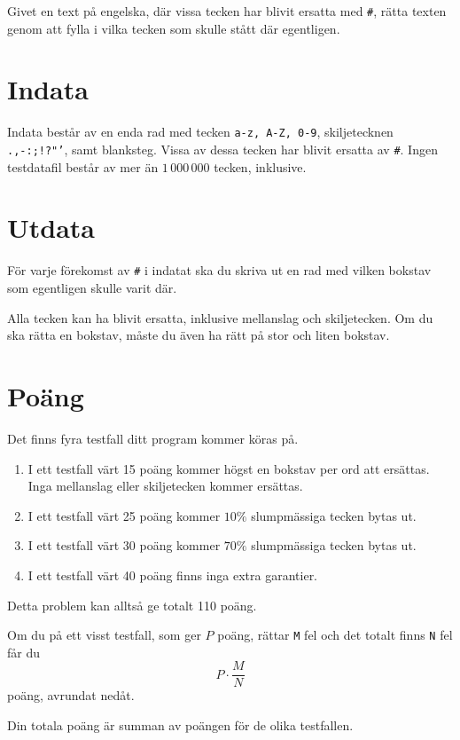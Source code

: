 
Givet en text på engelska, där vissa tecken har blivit ersatta med \texttt{\#}, rätta texten genom att fylla i vilka tecken som skulle stått där egentligen.

\section*{Indata}
Indata består av en enda rad med tecken \texttt{a-z, A-Z, 0-9}, skiljetecknen \texttt{.,-:;!?"'}, samt blanksteg. Vissa av dessa tecken har blivit ersatta av \texttt{\#}.
Ingen testdatafil består av mer än $1\,000\,000$ tecken, inklusive.

\section*{Utdata}
För varje förekomst av \texttt{\#} i indatat ska du skriva ut en rad med vilken bokstav som egentligen skulle varit där.

Alla tecken kan ha blivit ersatta, inklusive mellanslag och skiljetecken. Om du ska rätta en bokstav, måste du även ha rätt på stor och liten bokstav.

\section*{Poäng}

Det finns fyra testfall ditt program kommer köras på.
\begin{enumerate}
  \item I ett testfall värt 15 poäng kommer högst en bokstav per ord att ersättas. Inga mellanslag eller skiljetecken kommer ersättas.
  \item I ett testfall värt 25 poäng kommer $10\%$ slumpmässiga tecken bytas ut.
  \item I ett testfall värt 30 poäng kommer $70\%$ slumpmässiga tecken bytas ut.
  \item I ett testfall värt 40 poäng finns inga extra garantier.
\end{enumerate}

Detta problem kan alltså ge totalt 110 poäng.

Om du på ett visst testfall, som ger $P$ poäng, rättar \texttt{M} fel och det totalt finns \texttt{N} fel får du 
$$P \cdot \frac{M}{N}$$
poäng, avrundat nedåt.

Din totala poäng är summan av poängen för de olika testfallen.
